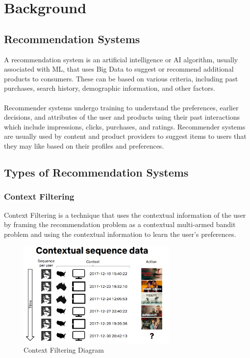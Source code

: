 \chapter{Background}
\minitoc

\section{Recommendation Systems}\label{sec:recommendation-systems}
A recommendation system is an artificial intelligence or AI algorithm, usually associated with ML, that uses Big Data to suggest or recommend additional products to consumers. These can be based on various criteria, including past purchases, search history, demographic information, and other factors. \cite{NvidiaRecSys} \\ \\
Recommender systems undergo training to understand the preferences, earlier decisions, and attributes of the user and products using their past interactions which include impressions, clicks, purchases, and ratings. Recommender systems are usually used by content and product providers to suggest items to users that they may like based on their profiles and preferences. 

\section{Types of Recommendation Systems}\label{sec:types-of-recommendation-systems}

\subsection{Context Filtering}
Context Filtering is a technique that uses the contextual information of the user by framing the recommendation problem as a contextual multi-armed bandit problem and using the contextual information to learn the user's preferences.
\begin{figure}[H]
    \centering
    \includegraphics[width=0.7\textwidth]{assets/contextual-sequence-prediction.png}
    \caption[Context Filtering Diagram]{Context Filtering Diagram \cite{NvidiaRecSys}} 
\end{figure}
